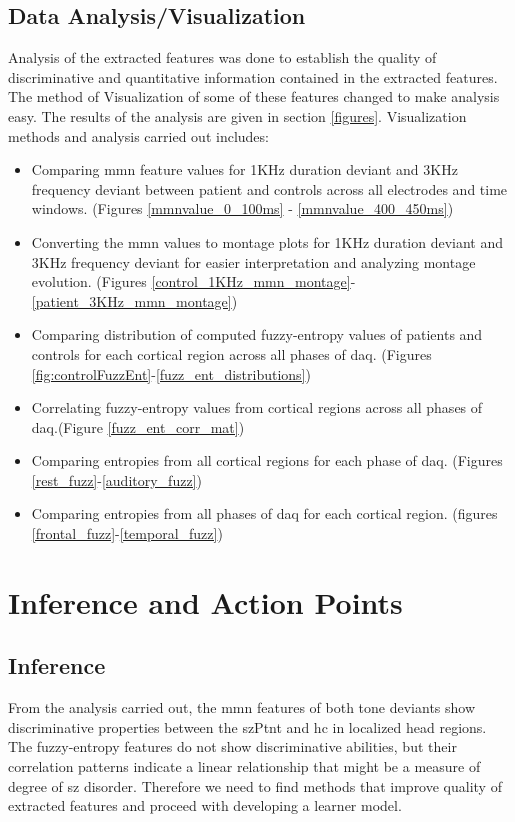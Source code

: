 \documentclass[10pt]{article}
\begin{document}
\subsection{Data Analysis/Visualization}\label{data_analyis}
 Analysis of the extracted features was done to establish the quality of discriminative 
 and quantitative information contained in the extracted features. The method of 
 Visualization of some of these features changed to make analysis easy.
 The results of the analysis are given in section \ref{figures}. Visualization methods 
 and analysis carried out includes:
\begin{itemize}
  \item Comparing \gls{mmn} feature values for 1KHz duration deviant and 3KHz frequency deviant 
  between patient and controls across all electrodes and time windows.
  (Figures \ref{mmnvalue_0_100ms} - \ref{mmnvalue_400_450ms})
  \item Converting the \gls{mmn} values to montage plots for 1KHz duration deviant 
  and 3KHz frequency deviant for easier interpretation and analyzing montage evolution.
  (Figures \ref{control_1KHz_mmn_montage}-\ref{patient_3KHz_mmn_montage})
  \item Comparing distribution of computed fuzzy-entropy values of patients and controls 
  for each cortical region across all phases of \gls{daq}.
  (Figures \ref{fig:controlFuzzEnt}-\ref{fuzz_ent_distributions}) 
  \item Correlating fuzzy-entropy values from cortical regions across 
  all phases of \gls{daq}.(Figure \ref{fuzz_ent_corr_mat})
  \item Comparing entropies from all cortical regions for each phase of \gls{daq}.
  (Figures \ref{rest_fuzz}-\ref{auditory_fuzz})
  \item Comparing entropies from all phases of \gls{daq} for each cortical region.
  (figures \ref{frontal_fuzz}-\ref{temporal_fuzz})
\end{itemize} 

\section{Inference and Action Points}
\subsection{Inference}
From the analysis carried out, the \gls{mmn} features of both tone deviants show 
discriminative properties between the \gls{szPtnt} and \gls{hc} in localized head 
regions. The fuzzy-entropy features do not show discriminative abilities, but their 
correlation patterns indicate a linear relationship that might be a measure of degree 
of \gls{sz} disorder. Therefore we need to find methods that improve quality of extracted 
features and proceed with developing a learner model.
\end{document}
